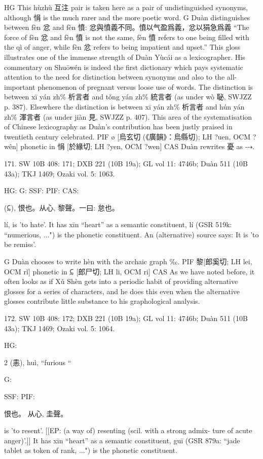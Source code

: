 HG This hùzhù 互注 pair is taken here as a pair of undistinguished synonyms, although 悁 is the much rarer and the more poetic word.
G  Duàn distinguishes between fèn 忿 and fèn 憤: 忿與憤義不同。憤以气盈爲義，忿以狷急爲義 ``The force of fèn 忿 and fèn 憤 is not the same, fèn 憤 refers to one being filled with the qì of anger, while fèn 忿 refers to being impatient and upset.'' This gloss illustrates one of the immense strength of Duàn Yùcái as a lexicographer. His commentary on Shuōwén is indeed the first dictionary which pays systematic attention to the need for distinction between synonyms and also to the all-important phenomenon of pregnant versus loose use of words. The distinction is between xī yán zh\% 析言者 and tǒng yán zh\% 統言者 (as under wò 䎵, SWJZZ p. 387). Elsewhere the distinction is between xī yán zh\% 析言者 and hún yán zh\% 渾言者 (as under jiàn 見, SWJZZ p. 407). This area of the systematisation of Chinese lexicography as Duàn's contribution has been justly praised in twentieth century celebrated.
PIF ø [烏玄切 (《廣韻》：烏縣切); LH ?uen, OCM ?wên] phonetic in 悁 [於緣切; LH ?yen, OCM ?wen]
CAS Duàn rewrites 憂 as ⤏.



171. SW 10B 408: 171; DXB 221 (10B 19a); GL vol 11: 4746b; Duàn 511 (10B 43a); TKJ 1469; Ozaki vol. 5: 1063.


HG:
G: SSF: PIF: CAS:

(⫇),
恨也。从心, 黎聲。一曰: 怠也。

lí,
is 'to hate'.
It has xīn ``heart'' as a semantic constituent,
lí (GSR 519k: ``numerious, ...") is the phonetic constituent. An (alternative) source says:
It is 'to be remiss'.

G   Duàn chooses to write hèn with the archaic graph ‰.
PIF    黎[郎奚切; LH lei, OCM rǐ] phonetic in ⫇ [郎尸切; LH li, OCM ri]
CAS As we have noted before, it often looks as if Xǔ Shèn gets into a periodic habit of providing alternative glosses for a series of characters, and he does this even when the alternative glosses contribute little substance to his graphological analysis.

172. SW 10B 408: 172; DXB 221 (10B 19a); GL vol 11: 4746b; Duàn 511 (10B 43a); TKJ 1469; Ozaki vol. 5: 1064.


HG:

2 (恚), huì, ``furious ``

G:

SSF: PIF:

恨也。
从心, 圭聲。

is 'to resent'. [[EP: (a way of) resenting (scil. with a strong admix- ture of acute anger)'.]]
It has xīn ``heart'' as a semantic constituent,
guī (GSR 879a: ``jade tablet as token of rank, ...") is the phonetic constituent.

